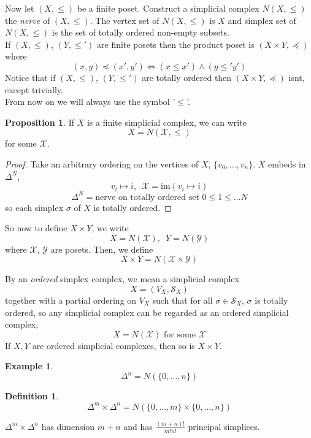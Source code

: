 \documentclass[a4paper,14pt]{extarticle}
\theoremstyle{definition}
\newtheorem*{definition}{Definition}
\newtheorem*{proposition}{Proposition}
\newtheorem*{eg}{Example}
\begin{document}
Now let $(X,\leq)$ be a finite poset. Construct a simplicial complex $N(X,\leq)$ the 
\emph{nerve}
 of $(X,\leq)$. The vertex set of $N(X,\leq)$ is $X$ and simplex set of $N(X,\leq)$ is 
 the set of totally ordered non-empty subsets. \\

 If $(X,\leq)$, $(Y,\leq')$ are finite posets then the product poset is 
 $(X\times Y,\preccurlyeq)$ where 
 \[(x,y)\preccurlyeq(x',y')\iff (x\leq x')\wedge(y\leq' y')\] Notice that if 
 $(X,\leq)$, $(Y,\leq')$ are totally ordered then $(X\times Y,\preccurlyeq)$ isnt, 
 except trivially. \\

\noindent From now on we will always use the symbol '$\leq$'.

\begin{proposition}
	If $X$ is a finite simplicial complex, we can write \[X=N(\mathcal{X},\leq)\] for some $\mathcal{X}$.
\end{proposition}

\begin{proof}
	Take an arbitrary ordering on the vertices of $X$, $\{v_0,\ldots,v_n\}$. $X$ embeds
	in $\Delta^N$, \[v_i\mapsto i,\,\,\,\mathcal{X}=\text{im}(v_i\mapsto i)\]
	\[\Delta^N=\text{nerve on totally ordered set }0\leq1\leq\ldots N\] so each simplex 
	$\sigma$ of $X$ is totally ordered.
\end{proof}

\noindent So now to define $X\times Y$, we write
\[X=N(\mathcal{X}), \,\,\,Y=N(\mathcal{Y})\] where $\mathcal{X}, \,\mathcal{Y}$ are posets.
Then, we define \[X\times Y=N(\mathcal{X}\times\mathcal{Y})\]

\noindent By an \emph{ordered} simplex complex, we mean a simplicial complex 
\[X=(V_X, \mathcal{S}_X)\] together with a partial ordering on $V_X$ such that for all 
$\sigma\in\mathcal{S}_X$, $\sigma$ is totally ordered, so any simplicial complex can be
regarded as an ordered simplicial complex,
\[X=N(\mathcal{X})\text{ for some }\mathcal{X}\]
If $X,Y$ are ordered simplicial complexes, then so is $X\times Y$.

\begin{eg}
	\[\Delta^n=N(\{0,\ldots,n\})\]
\end{eg}

\begin{definition}
	\[\Delta^m\times\Delta^n=N(\{0		,\ldots,m\}\times\{0,\ldots,n\})\]
\end{definition}

$\Delta^m\times\Delta^n$ has dimension $m+n$ and has $\frac{(m+n)!}{m!n!}$ principal simplices.
\end{document}
